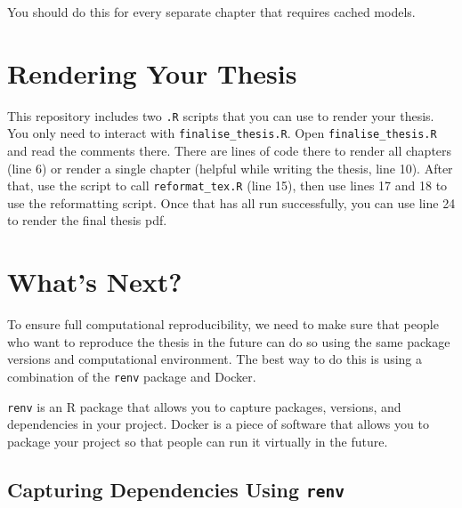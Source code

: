\documentclass[../main.tex]{subfiles}
\begin{document}
\begin{Shaded}
\begin{Highlighting}[]

\NormalTok{ (}\SpecialCharTok{!}\SpecialCharTok{$}\NormalTok{(}\NormalTok{) \}}
\end{Highlighting}
\end{Shaded}

You should do this for every separate chapter that requires cached
models.

\section{Rendering Your Thesis}\label{rendering-your-thesis}

This repository includes two \texttt{.R} scripts that you can use to
render your thesis. You only need to interact with
\texttt{finalise\_thesis.R}. Open \texttt{finalise\_thesis.R} and read
the comments there. There are lines of code there to render all chapters
(line 6) or render a single chapter (helpful while writing the thesis,
line 10). After that, use the script to call \texttt{reformat\_tex.R}
(line 15), then use lines 17 and 18 to use the reformatting script. Once
that has all run successfully, you can use line 24 to render the final
thesis pdf.

\section{What's Next?}\label{whats-next}

To ensure full computational reproducibility, we need to make sure that
people who want to reproduce the thesis in the future can do so using
the same package versions and computational environment. The best way to
do this is using a combination of the \texttt{renv} package and Docker.

\texttt{renv} is an R package that allows you to capture packages,
versions, and dependencies in your project. Docker is a piece of
software that allows you to package your project so that people can run
it virtually in the future.

\subsection{\texorpdfstring{Capturing Dependencies Using
\texttt{renv}}{Capturing Dependencies Using renv}}\label{capturing-dependencies-using-renv}
\end{document}
